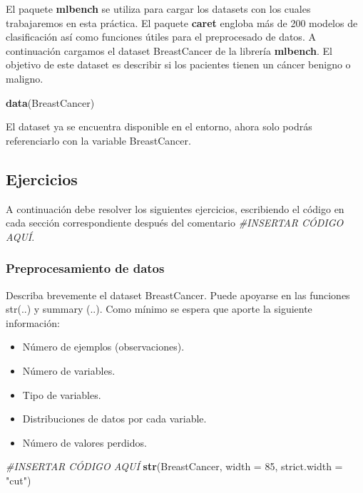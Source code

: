 \documentclass[]{article}
\newenvironment{Shaded}{\begin{snugshade}}{\end{snugshade}}
\newcommand{\CommentTok}[1]{\textcolor[rgb]{0.56,0.35,0.01}{\textit{#1}}}
\newcommand{\DataTypeTok}[1]{\textcolor[rgb]{0.13,0.29,0.53}{#1}}
\newcommand{\DecValTok}[1]{\textcolor[rgb]{0.00,0.00,0.81}{#1}}
\newcommand{\KeywordTok}[1]{\textcolor[rgb]{0.13,0.29,0.53}{\textbf{#1}}}
\newcommand{\NormalTok}[1]{#1}
\newcommand{\StringTok}[1]{\textcolor[rgb]{0.31,0.60,0.02}{#1}}
\providecommand{\tightlist}{%
  \setlength{\itemsep}{0pt}\setlength{\parskip}{0pt}}
\begin{document}
El paquete \textbf{mlbench} se utiliza para cargar los datasets con los
cuales trabajaremos en esta práctica. El paquete \textbf{caret} engloba
más de 200 modelos de clasificación así como funciones útiles para el
preprocesado de datos. A continuación cargamos el dataset BreastCancer
de la librería \textbf{mlbench}. El objetivo de este dataset es
describir si los pacientes tienen un cáncer benigno o maligno.

\begin{Shaded}
\begin{Highlighting}[]
\KeywordTok{data}\NormalTok{(BreastCancer)}
\end{Highlighting}
\end{Shaded}

El dataset ya se encuentra disponible en el entorno, ahora solo podrás
referenciarlo con la variable BreastCancer.

\hypertarget{ejercicios}{%
\subsection{Ejercicios}\label{ejercicios}}

A continuación debe resolver los siguientes ejercicios, escribiendo el
código en cada sección correspondiente después del comentario
\emph{\#INSERTAR CÓDIGO AQUÍ}.

\hypertarget{preprocesamiento-de-datos}{%
\subsubsection{Preprocesamiento de
datos}\label{preprocesamiento-de-datos}}

Describa brevemente el dataset BreastCancer. Puede apoyarse en las
funciones str(..) y summary (..). Como mínimo se espera que aporte la
siguiente información:

\begin{itemize}
\tightlist
\item
  Número de ejemplos (observaciones).
\item
  Número de variables.
\item
  Tipo de variables.
\item
  Distribuciones de datos por cada variable.
\item
  Número de valores perdidos.
\end{itemize}

\begin{Shaded}
\begin{Highlighting}[]
\CommentTok{#INSERTAR CÓDIGO AQUÍ}
\KeywordTok{str}\NormalTok{(BreastCancer, }\DataTypeTok{width =} \DecValTok{85}\NormalTok{, }\DataTypeTok{strict.width =} \StringTok{"cut"}\NormalTok{)}
\end{Highlighting}
\end{Shaded}
\end{document}
